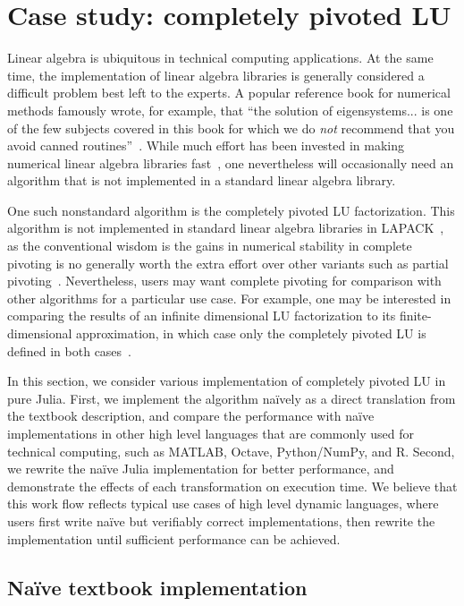 \section{Case study: completely pivoted LU}

Linear algebra is ubiquitous in technical computing applications. At the same
time, the implementation of linear algebra libraries is generally considered a
difficult problem best left to the experts. A popular reference book for
numerical methods famously wrote, for example, that ``the solution of
eigensystems... is one of the few subjects covered in this book for which we do
\textit{not} recommend that you avoid canned routines''~\cite[Section 11.0, p.
461]{Press1992}. While much effort has been invested in making
numerical linear algebra libraries
fast~\cite{lapack,Gunnels2001,OpenBLAS,VanZee2013}, one nevertheless will
occasionally need an algorithm that is not implemented in a
standard linear algebra library.

One such nonstandard algorithm is the completely pivoted LU factorization. This
algorithm is not implemented in standard linear algebra libraries in
LAPACK~\cite{lapack}, as the conventional wisdom is the gains in numerical
stability in complete pivoting is no generally worth the extra effort over
other variants such as partial pivoting~\cite{Golub2013}.  Nevertheless, users
may want complete pivoting for comparison with other algorithms for a
particular use case. For example, one may be interested in comparing the
results of an infinite dimensional LU factorization to its finite-dimensional
approximation, in which case only the completely pivoted LU is defined in both
cases~\cite{Townsend2014}.

In this section, we consider various implementation of completely pivoted LU in
pure Julia. First, we implement the algorithm na\"ively as a direct translation
from the textbook description, and compare the performance with na\"ive
implementations in other high level languages that are commonly used for
technical computing, such as MATLAB, Octave, Python/NumPy, and R. Second, we
rewrite the na\"ive Julia implementation for better performance, and
demonstrate the effects of each transformation on execution time. We believe
that this work flow reflects typical use cases of high level dynamic languages,
where users first write na\"ive but verifiably correct implementations, then
rewrite the implementation until sufficient performance can be achieved.



\subsection{Na\"ive textbook implementation}

